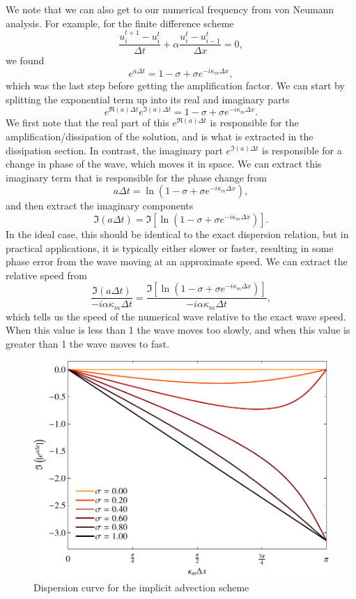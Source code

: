 We note that we can also get to our numerical frequency from von Neumann analysis. For example, for the finite difference scheme
\begin{equation}
	\frac{u_i^{t+1} - u_{i}^t}{\Delta t} +  \alpha \frac{u_i^t - u_{i-1}^t}{\Delta x} = 0,
\end{equation}
we found
\begin{equation}
	e^{a\Delta t} = 1 - \sigma + \sigma e^{-i \kappa_m \Delta x},
\end{equation} 
which was the last step before getting the amplification factor. We can start by splitting the exponential term up into its real and imaginary parts
\begin{equation}
	e^{\Re{(a)}\Delta t} e^{\Im{(a)}\Delta t} = 1 - \sigma + \sigma e^{-i \kappa_m \Delta x}.
\end{equation} 
We first note that the real part of this $e^{\Re{(a)}\Delta t}$ is responsible for the amplification/dissipation of the solution, and is what is extracted in the dissipation section. In contrast, the imaginary part $e^{\Im{(a)}\Delta t}$ is responsible for a change in phase of the wave, which moves it in space. We can extract this imaginary term that is responsible for the phase change from
\begin{equation}
	a\Delta t = \ln \left(1 - \sigma + \sigma e^{-i \kappa_m \Delta x} \right),
\end{equation} 
and then extract the imaginary components
\begin{equation}
	\Im(a\Delta t) = \Im{ \left[ \ln \left(1 - \sigma + \sigma e^{-i \kappa_m \Delta x} \right) \right]}.
\end{equation}
In the ideal case, this should be identical to the exact dispersion relation, but in practical applications, it is typically either slower or faster, resulting in some phase error from the wave moving at an approximate speed. We can extract the relative speed from
\begin{equation}
	\frac{\Im(a\Delta t)}{-i \alpha \kappa_m \Delta t} = \frac{\Im{ \left[ \ln \left(1 - \sigma + \sigma e^{-i \kappa_m \Delta x} \right) \right]}}{-i \alpha \kappa_m \Delta t},
\end{equation}
which tells us the speed of the numerical wave relative to the exact wave speed. When this value is less than 1 the wave moves too slowly, and when this value is greater than 1 the wave moves to fast.
\begin{figure}[htbp]
	\centering
	\includegraphics[width=0.6\linewidth]{Pictures/dispersion_adv_explct}
	\caption{Dispersion curve for the implicit advection scheme}
	\label{fig:dissipation_advection_implicit}
\end{figure}
